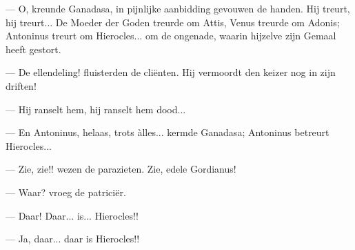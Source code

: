 \documentclass[a4paper, 12pt, oneside, dutch]{article}
\begin{document}
--- O, kreunde Ganadasa, in pijnlijke aanbidding gevouwen de handen. Hij treurt, hij treurt... De Moeder der Goden treurde om Attis, Venus treurde om Adonis; Antoninus treurt om Hierocles... om de ongenade, waarin hijzelve zijn Gemaal heeft gestort.

--- De ellendeling! fluisterden de cliënten. Hij vermoordt den keizer nog in zijn driften!

--- Hij ranselt hem, hij ranselt hem dood...

--- En Antoninus, helaas, trots àlles... kermde Ganadasa; Antoninus betreurt Hierocles...

--- Zie, zie!! wezen de parazieten. Zie, edele Gordianus!

--- Waar? vroeg de patriciër.

--- Daar! Daar... is... Hierocles!!

--- Ja, daar... daar is Hierocles!!
\end{document}
